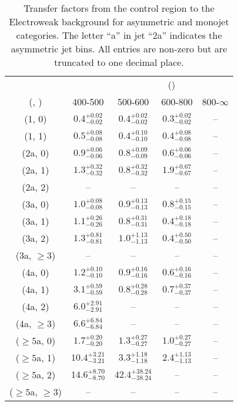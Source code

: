 \begin{table}[h!]
\tiny
\centering
\caption{Transfer factors from the \gj control region to the Electroweak background for asymmetric and monojet categories. The letter ``a'' in jet \eg ``2a''  indicates the asymmetric jet bins. All entries are non-zero but are truncated to one decimal place.\label{tab:tf_total_gj_asym}}
\begin{tabular}
{ccccc}
	\hline\hline
&	& \multicolumn{4}{c}{\scalht (\gev)} \\ 
	 (\njet,  \nb) & 400-500 & 500-600 & 600-800 & 800-$\infty$ \\ [0.8ex] 
\hline
	(1, 0) & $0.4^{+ 0.02 }_{- 0.02 }$ & $0.4^{+ 0.02 }_{- 0.02 }$ & $0.3^{+ 0.02 }_{- 0.02 }$ & -- \\[0.5ex] 
	(1, 1) & $0.5^{+ 0.08 }_{- 0.08 }$ & $0.4^{+ 0.10 }_{- 0.10 }$ & $0.4^{+ 0.08 }_{- 0.08 }$ & -- \\[0.5ex] 
	(2a, 0) & $0.9^{+ 0.06 }_{- 0.06 }$ & $0.8^{+ 0.09 }_{- 0.09 }$ & $0.6^{+ 0.06 }_{- 0.06 }$ & -- \\[0.5ex] 
	(2a, 1) & $1.3^{+ 0.32 }_{- 0.32 }$ & $0.8^{+ 0.32 }_{- 0.32 }$ & $1.9^{+ 0.67 }_{- 0.67 }$ & -- \\[0.5ex] 
	(2a, 2) & -- & -- & -- & -- \\[0.5ex] 
	(3a, 0) & $1.0^{+ 0.08 }_{- 0.08 }$ & $0.9^{+ 0.13 }_{- 0.13 }$ & $0.8^{+ 0.15 }_{- 0.15 }$ & -- \\[0.5ex] 
	(3a, 1) & $1.1^{+ 0.26 }_{- 0.26 }$ & $0.8^{+ 0.31 }_{- 0.31 }$ & $0.4^{+ 0.18 }_{- 0.18 }$ & -- \\[0.5ex] 
	(3a, 2) & $1.3^{+ 0.81 }_{- 0.81 }$ & $1.0^{+ 1.13 }_{- 1.13 }$ & $0.4^{+ 0.50 }_{- 0.50 }$ & -- \\[0.5ex] 
	(3a, $\ge3$) & -- & -- & -- & -- \\[0.5ex] 
	(4a, 0) & $1.2^{+ 0.10 }_{- 0.10 }$ & $0.9^{+ 0.16 }_{- 0.16 }$ & $0.6^{+ 0.16 }_{- 0.16 }$ & -- \\[0.5ex] 
	(4a, 1) & $3.1^{+ 0.59 }_{- 0.59 }$ & $0.8^{+ 0.28 }_{- 0.28 }$ & $0.7^{+ 0.37 }_{- 0.37 }$ & -- \\[0.5ex] 
	(4a, 2) & $6.0^{+ 2.91 }_{- 2.91 }$ & -- & -- & -- \\[0.5ex] 
	(4a, $\ge3$) & $6.6^{+ 6.84 }_{- 6.84 }$ & -- & -- & -- \\[0.5ex] 
	($\ge5$a, 0) & $1.7^{+ 0.20 }_{- 0.20 }$ & $1.3^{+ 0.27 }_{- 0.27 }$ & $1.0^{+ 0.27 }_{- 0.27 }$ & -- \\[0.5ex] 
	($\ge5$a, 1) & $10.4^{+ 3.21 }_{- 3.21 }$ & $3.3^{+ 1.18 }_{- 1.18 }$ & $2.4^{+ 1.13 }_{- 1.13 }$ & -- \\[0.5ex] 
	($\ge5$a, 2) & $14.6^{+ 8.70 }_{- 8.70 }$ & $42.4^{+ 38.24 }_{- 38.24 }$ & -- & -- \\[0.5ex] 
	($\ge5$a, $\ge3$) & -- & -- & -- & -- \\[0.5ex] 
	\hline
	\hline
\end{tabular}
\end{table}

